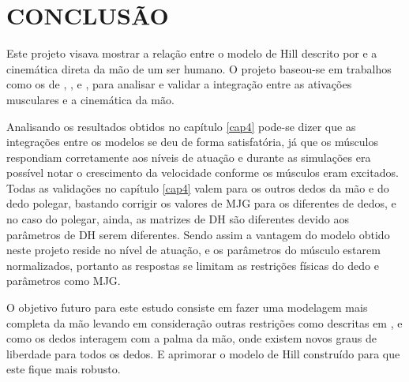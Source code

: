 
\chapter{CONCLUSÃO}\label{cap5}
Este projeto visava mostrar a relação entre o modelo de Hill descrito por \cite{hill1938heat} e a cinemática direta da mão de um ser humano. O projeto baseou-se em trabalhos como os de \cite{zajac1989muscle}, \cite{lee1995model}, \cite{feng1999surface} e \cite{rosen1999performances}, para analisar e validar a integração entre as ativações musculares e a cinemática da mão.

Analisando os resultados obtidos no capítulo \ref{cap4} pode-se dizer que as integrações entre os modelos se deu de forma satisfatória, já que os músculos respondiam corretamente aos níveis de atuação e durante as simulações era possível notar o crescimento da velocidade conforme os músculos eram excitados. Todas as validações no capítulo \ref{cap4} valem para os outros dedos da mão e do dedo polegar, bastando corrigir os valores de MJG para os diferentes de dedos, e no caso do polegar, ainda, as matrizes de DH são diferentes devido aos parâmetros de DH serem diferentes. Sendo assim a vantagem do modelo obtido neste projeto reside no nível de atuação, e os parâmetros do músculo estarem normalizados, portanto as respostas se limitam as restrições físicas do dedo e parâmetros como MJG.

O objetivo futuro para este estudo consiste em fazer uma modelagem mais completa da mão levando em consideração outras restrições como descritas em \cite{lee1995model}, e como os dedos interagem com a palma da mão, onde existem novos graus de liberdade para todos os dedos. E aprimorar o modelo de Hill construído para que este fique mais robusto.

